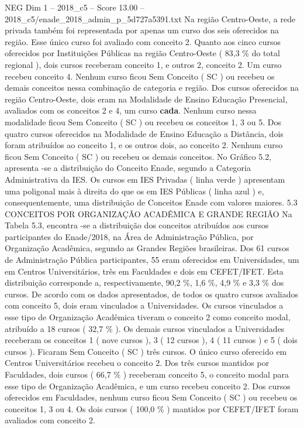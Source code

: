 \begin{textsample}{NEG Dim 1 – 2018\_c5 – Score 13.00 – 2018\_c5/enade\_2018\_admin\_p\_5d727a5391.txt}
Na região Centro-Oeste, a rede privada também foi representada por apenas um curso dos seis oferecidos na região.
Esse único curso foi avaliado com conceito 2.
Quanto aos cinco cursos oferecidos por Instituições Públicas na região Centro-Oeste ( 83,3 \% do total regional ), dois cursos receberam conceito 1, e outros 2, conceito 2.
Um curso recebeu conceito 4.
Nenhum curso ficou Sem Conceito ( SC ) ou recebeu os demais conceitos nessa combinação de categoria e região.
Dos cursos oferecidos na região Centro-Oeste, dois eram na Modalidade de Ensino Educação Presencial, avaliados com os conceitos 2 e 4, um curso \textbf{cada}.
Nenhum curso nessa modalidade ficou Sem Conceito ( SC ) ou recebeu os conceitos 1, 3 ou 5.
Dos quatro cursos oferecidos na Modalidade de Ensino Educação a Distância, dois foram atribuídos ao conceito 1, e os outros dois, ao conceito 2.
Nenhum curso ficou Sem Conceito ( SC ) ou recebeu os demais conceitos.
No Gráfico 5.2, apresenta -se a distribuição do Conceito Enade, segundo a Categoria Administrativa da IES.
Os cursos em IES Privadas ( linha verde ) apresentam uma poligonal mais à direita do que os em IES Públicas ( linha azul ) e, consequentemente, uma distribuição de Conceitos Enade com valores maiores. 5.3 CONCEITOS POR ORGANIZAÇÃO ACADÊMICA E GRANDE REGIÃO Na Tabela 5.3, encontra -se a distribuição dos conceitos atribuídos aos cursos participantes do Enade/2018, na Área de Administração Pública, por Organização Acadêmica, segundo as Grandes Regiões brasileiras.
Dos 61 cursos de Administração Pública participantes, 55 eram oferecidos em Universidades, um em Centros Universitários, três em Faculdades e dois em CEFET/IFET.
Esta distribuição corresponde a, respectivamente, 90,2 \%, 1,6 \%, 4,9 \% e 3,3 \% dos cursos.
De acordo com os dados apresentados, de todos os quatro cursos avaliados com conceito 5, dois eram vinculados a Universidades.
Os cursos vinculados a esse tipo de Organização Acadêmica tiveram o conceito 2 como conceito modal, atribuído a 18 cursos ( 32,7 \% ).
Os demais cursos vinculados a Universidades receberam os conceitos 1 ( nove cursos ), 3 ( 12 cursos ), 4 ( 11 cursos ) e 5 ( dois cursos ).
Ficaram Sem Conceito ( SC ) três cursos.
O único curso oferecido em Centros Universitários recebeu o conceito 2.
Dos três cursos mantidos por Faculdades, dois cursos ( 66,7 \% ) receberam conceito 5, o conceito modal para esse tipo de Organização Acadêmica, e um curso recebeu conceito 2.
Dos cursos oferecidos em Faculdades, nenhum curso ficou Sem Conceito ( SC ) ou recebeu os conceitos 1, 3 ou 4.
Os dois cursos ( 100,0 \% ) mantidos por CEFET/IFET foram avaliados com conceito 2.

\end{textsample}
